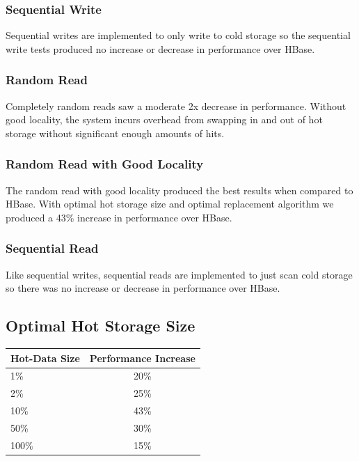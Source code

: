 \documentclass[12pt]{article}
\begin{document}
\subsubsection{Sequential Write}
Sequential writes are implemented to only write to cold storage so the sequential write tests produced no increase or decrease in performance over HBase. 

\subsubsection{Random Read}
Completely random reads saw a moderate 2x decrease in performance. Without good locality, the system incurs overhead from swapping in and out of hot storage without significant enough amounts of hits. 

\subsubsection{Random Read with Good Locality}
The random read with good locality produced the best results when compared to HBase. With optimal hot storage size and optimal replacement algorithm we produced a 43\% increase in performance over HBase. 

\subsubsection{Sequential Read}
Like sequential writes, sequential reads are implemented to just scan cold storage so there was no increase or decrease in performance over HBase.


\subsection{Optimal Hot Storage Size}

\begin{center}
  \begin{tabular}{ | l | c |}
    \hline
    Hot-Data Size & Performance Increase \\ \hline \hline
    1\% & 20\% \\ \hline 
    2\% & 25\% \\ \hline
    10\% & 43\% \\ \hline
    50\% & 30\% \\ \hline
    100\% & 15\% \\
    \hline
  \end{tabular}
\end{center}
\end{document}
